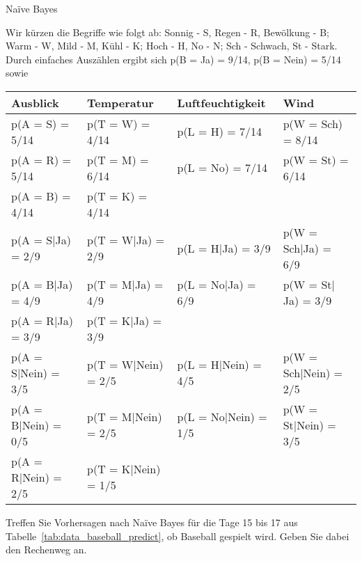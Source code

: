 \begin{task}[credit=19]{Na\"ive Bayes}
\begin{subtask}[title=Wahrscheinlichkeiten,points=6]
\begin{solution}
Wir kürzen die Begriffe wie folgt ab: Sonnig - S, Regen - R, Bewölkung - B; Warm - W, Mild - M, Kühl - K; Hoch - H, No - N; Sch - Schwach, St - Stark. Durch einfaches Auszählen ergibt sich p(B = Ja) = 9/14, p(B = Nein) = 5/14 sowie
\begin{tabular}{l|l|l|l}
	Ausblick & Temperatur & Luftfeuchtigkeit & Wind \\ \hline
p(A = S) = 5/14 & p(T = W) = 4/14 & p(L = H) = 7/14 & p(W = Sch) = 8/14 \\
p(A = R) = 5/14 & p(T = M) = 6/14 & p(L = No) = 7/14 & p(W = St) = 6/14 \\
p(A = B) = 4/14 & p(T = K) = 4/14 &                 &                    \\ 
p(A = S|Ja) = 2/9 & p(T = W|Ja) = 2/9 & p(L = H|Ja) = 3/9 & p(W = Sch|Ja) = 6/9 \\
p(A = B|Ja) = 4/9 & p(T = M|Ja) = 4/9 & p(L = No|Ja) = 6/9 & p(W = St| Ja) = 3/9 \\
p(A = R|Ja) = 3/9 & p(T = K|Ja) = 3/9 &                   &                     \\ 
p(A = S|Nein) = 3/5 & p(T = W|Nein) = 2/5 & p(L = H|Nein) = 4/5 & p(W = Sch|Nein) = 2/5 \\
p(A = B|Nein) = 0/5 & p(T = M|Nein) = 2/5 & p(L = No|Nein) = 1/5 & p(W = St|Nein) = 3/5  \\
p(A = R|Nein) = 2/5 & p(T = K|Nein) = 1/5 &                     &                       
\end{tabular} 
\end{solution}

\end{subtask}

\begin{subtask}[points=9,title=Vorhersage]
Treffen Sie Vorhersagen nach Na\"ive Bayes für die Tage 15 bis 17 aus Tabelle~\ref{tab:data_baseball_predict}, ob Baseball gespielt wird.
Geben Sie dabei den Rechenweg an.


\end{subtask}
\end{task}
